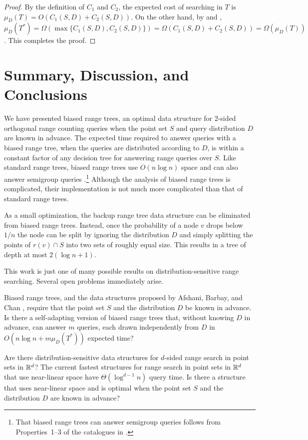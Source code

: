 \documentclass{patmorin}
\begin{document}
\begin{proof}
By the definition of $C_1$ and $C_2$, the expected cost of searching in
$T$ is $\mu_D(T)=O(C_1(S,D)+C_2(S,D))$.  On the other hand, by
 and , $\mu_D(T^*) =
\Omega(\max\{C_1(S,D),C_2(S,D)\}) =
\Omega(C_1(S,D)+C_2(S,D))=\Omega(\mu_D(T))$.  This completes the proof.
\end{proof}

\section{Summary, Discussion, and Conclusions}

We have presented biased range trees, an optimal data structure for
2-sided orthogonal range counting queries when the point set $S$
and query distribution $D$ are known in advance. The expected time
required to answer queries with a biased range tree, when the queries are
distributed according to $D$, is within a constant factor of any decision
tree for answering range queries over $S$.  Like standard range trees,
biased range trees use $O(n\log n)$ space and can also answer semigroup
queries \cite{ae133,ae292}.\footnote{That biased range trees can answer
semigroup queries follows from Properties~1--3 of the catalogues in
.} Although the analysis of biased range trees is
complicated, their implementation is not much more complicated than that
of standard range trees.

As a small optimization, the backup range tree data structure can be
eliminated from biased range trees.  Instead, once the probability of
a node $v$ drops below $1/n$ the node can be split by ignoring the
distribution $D$ and simply splitting the points of $r(v)\cap S$ into
two sets of roughly equal size.  This results in a tree of depth at
most $2(\log n+1)$.

This work is just one of many possible results on
distribution-sensitive range searching.  Several open problems
immediately arise.  

\begin{op}
Biased range trees, and the data structures proposed by Afshani, Barbay,
and Chan \cite{abc09}, require that the point set $S$ and the distribution
$D$ be known in advance.  Is there a self-adapting version of biased range
trees that, without knowing $D$ in advance, can answer $m$ queries, each
drawn independently from $D$ in $O(n\log n+ m\mu_D(T^*))$ expected time?
\end{op}

\begin{op}
Are there distribution-sensitive data structures for $d$-sided range
search in point sets in $\mathbb{R}^d$?  The current fastest structures
for range search in point sets in $\mathbb{R}^d$ that use near-linear space
have $\Theta(\log^{d-1} n)$ query time.  Is there a structure that
uses near-linear space and is optimal when the point set $S$ and the
distribution $D$ are known in advance?
\end{op}



\end{document}
